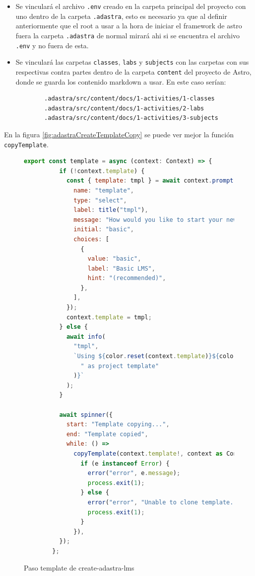 \begin{itemize}
    \item Se vinculará el archivo \verb|.env| creado en la carpeta principal del proyecto con uno dentro de la carpeta \verb|.adastra|, esto es necesario ya que al definir anteriormente que el root a usar a la hora de iniciar el framework de astro fuera la carpeta \verb|.adastra| de normal mirará ahi si se encuentra el archivo \verb|.env| y no fuera de esta.
    \item Se vinculará las carpetas \verb|classes|, \verb|labs| y \verb|subjects| con las carpetas con sus respectivas contra partes dentro de la carpeta \verb|content| del proyecto de Astro, donde se guarda los contenido markdown a usar. En este caso serían:
    \begin{verbatim}
        .adastra/src/content/docs/1-activities/1-classes
        .adastra/src/content/docs/1-activities/2-labs
        .adastra/src/content/docs/1-activities/3-subjects
    \end{verbatim}
\end{itemize}

En la figura \ref{fig:adastraCreateTemplateCopy} se puede ver mejor la función \verb|copyTemplate|.

\begin{figure}
    \begin{lstlisting}[language=Javascript]
        export const template = async (context: Context) => {
          if (!context.template) {
            const { template: tmpl } = await context.prompt({
              name: "template",
              type: "select",
              label: title("tmpl"),
              message: "How would you like to start your new project?",
              initial: "basic",
              choices: [
                {
                  value: "basic",
                  label: "Basic LMS",
                  hint: "(recommended)",
                },
              ],
            });
            context.template = tmpl;
          } else {
            await info(
              "tmpl",
              `Using ${color.reset(context.template)}${color.dim(
                " as project template"
              )}`
            );
          }
        
          await spinner({
            start: "Template copying...",
            end: "Template copied",
            while: () =>
              copyTemplate(context.template!, context as Context).catch((e) => {
                if (e instanceof Error) {
                  error("error", e.message);
                  process.exit(1);
                } else {
                  error("error", "Unable to clone template.");
                  process.exit(1);
                }
              }),
          });
        };
    \end{lstlisting}
    \caption{Paso template de create-adastra-lms}
    \label{fig:adastraCreateTemplate}
\end{figure}

